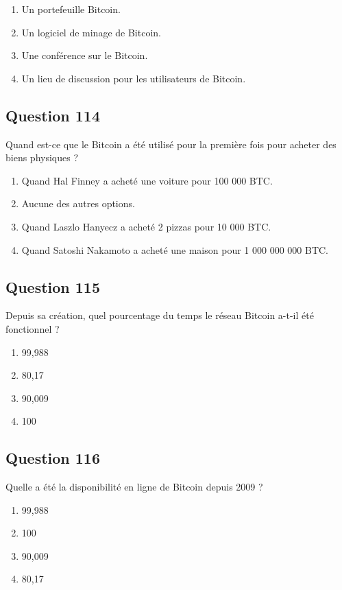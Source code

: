 \documentclass[12pt,a4paper]{article}
\begin{document}
\begin{enumerate}[label=\Alph*., leftmargin=*]
\item Un portefeuille Bitcoin.
\item Un logiciel de minage de Bitcoin.
\item Une conférence sur le Bitcoin.
\item Un lieu de discussion pour les utilisateurs de Bitcoin.
\end{enumerate}

\bigskip


\subsection*{Question 114}
Quand est-ce que le Bitcoin a été utilisé pour la première fois pour acheter des biens physiques ?

\begin{enumerate}[label=\Alph*., leftmargin=*]
\item Quand Hal Finney a acheté une voiture pour 100 000 BTC.
\item Aucune des autres options.
\item Quand Laszlo Hanyecz a acheté 2 pizzas pour 10 000 BTC.
\item Quand Satoshi Nakamoto a acheté une maison pour 1 000 000 000 BTC.
\end{enumerate}

\bigskip


\subsection*{Question 115}
Depuis sa création, quel pourcentage du temps le réseau Bitcoin a-t-il été fonctionnel ?

\begin{enumerate}[label=\Alph*., leftmargin=*]
\item 99,988 %
\item 80,17 %
\item 90,009 %
\item 100 %
\end{enumerate}

\bigskip


\subsection*{Question 116}
Quelle a été la disponibilité en ligne de Bitcoin depuis 2009 ?

\begin{enumerate}[label=\Alph*., leftmargin=*]
\item 99,988 %
\item 100 %
\item 90,009 %
\item 80,17 %
\end{enumerate}
\end{document}
